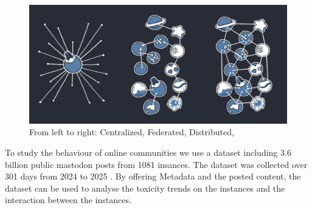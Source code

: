 \begin{figure}[h]
    \centering
    \includegraphics[width=\textwidth]{../material/network_models.jpg}
    \caption{From left to right: Centralized, Federated, Distributed, \citep{mastodon:docs}}
    \label{fig:network-models}
\end{figure}

To study the behaviour of online communities we use a dataset including 3.6 billion public mastodon posts from 1081 insances. The dataset was collected over 301 days from 2024 to 2025 \citep{ernst:2024}. By offering Metadata and the posted content, the dataset can be used to analyse the toxicity trends on the instances and the interaction between the instances.

\enlargethispage{\baselineskip}